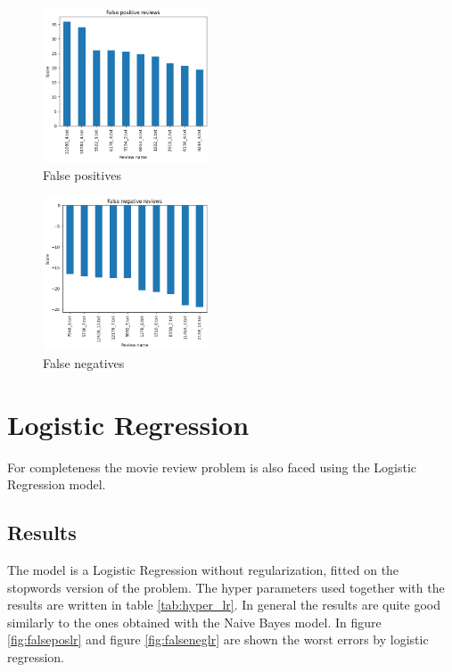 \documentclass{article}
\begin{document}
\vspace{0.3cm}
\begin{multicols}{2}

    \begin{figure}[H]
        \centering
        \includegraphics[width=0.44\textwidth]{false_positives.png}
        \caption{\small False positives}
        \label{fig:falsepos}
    \end{figure}

    \begin{figure}[H]
        \centering
        \includegraphics[width=0.44\textwidth]{false negatives.png}
        \caption{\small False negatives}
        \label{fig:falseneg}
    \end{figure}

\end{multicols}

\section{Logistic Regression}
For completeness the movie review problem is also faced using the Logistic Regression model.
\subsection{Results}
The model is a Logistic Regression without regularization, fitted on the stopwords version of the problem. The hyper parameters used together with the results are written in table \ref{tab:hyper_lr}.
In general the results are quite good similarly to the ones obtained with the Naive Bayes model.
In figure \ref{fig:falseposlr} and figure \ref{fig:falseneglr} are shown the worst errors by logistic regression. 
\end{document}
